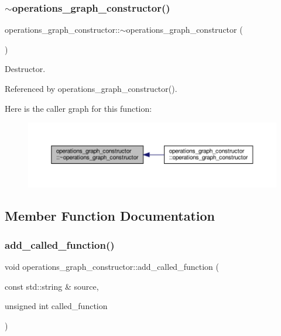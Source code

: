 \subsubsection{\texorpdfstring{$\sim$operations\+\_\+graph\+\_\+constructor()}{~operations\_graph\_constructor()}}
{\footnotesize\ttfamily operations\+\_\+graph\+\_\+constructor\+::$\sim$operations\+\_\+graph\+\_\+constructor (\begin{DoxyParamCaption}{ }\end{DoxyParamCaption})\hspace{0.3cm}{\ttfamily [default]}}



Destructor. 



Referenced by operations\+\_\+graph\+\_\+constructor().

Here is the caller graph for this function\+:
\nopagebreak
\begin{figure}[H]
\begin{center}
\leavevmode
\includegraphics[width=350pt]{d7/d2f/classoperations__graph__constructor_ae35d11d539285615f193316d83316211_icgraph}
\end{center}
\end{figure}


\subsection{Member Function Documentation}
\mbox{\label{classoperations__graph__constructor_ac5826ccd6edc3ddb2ba4d1a5e695f809}} 
\subsubsection{\texorpdfstring{add\+\_\+called\+\_\+function()}{add\_called\_function()}}
{\footnotesize\ttfamily void operations\+\_\+graph\+\_\+constructor\+::add\+\_\+called\+\_\+function (\begin{DoxyParamCaption}\item[{const std\+::string \&}]{source,  }\item[{unsigned int}]{called\+\_\+function }\end{DoxyParamCaption})}



